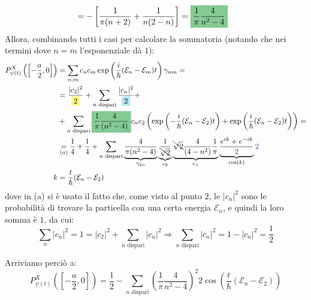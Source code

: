 \documentclass[../../FisicaTeorica.tex]{subfiles}
\begin{document}
\begin{enumerate}
\begin{align*}
&= -\left[\frac{1}{\pi(n+2)}+\frac{1}{n(2-n)}\right]=\hlc{ForestGreen}{\frac{1}{\pi} \frac{4}{n^2-4}}
\end{align*}
Allora, combinando tutti i casi per calcolare la sommatoria (notando che nei termini dove $n=m$ l'esponenziale dà $1$):
\begin{align*}
P^X_{\psi(t)}\left(\left[-\frac{a}{2},0\right]\right)&=
\sum_{n,m} c_n c_m \exp\left(\frac{i}{\hbar}(\mathcal{E}_n-\mathcal{E}_m)t\right)\gamma_{nm}
=\\
&=\frac{|c_2|^2}{\hlc{Yellow}{2}}+\sum_{n \text{ dispari}}\frac{|c_n|^2}{\hlc{SkyBlue}{2}}+\\
&+\sum_{n \text{ dispari}}\hlc{ForestGreen}{\frac{1}{\pi}\frac{4}{(n^2-4)}}c_n c_2\left(\exp\left(-\frac{i}{\hbar}(\mathcal{E}_n-\mathcal{E}_2)t \right)+ \exp\left(\frac{i}{\hbar}(\mathcal{E}_n-\mathcal{E}_2)t\right)\right) =\\
&\underset{(a)}{=}\frac{1}{4} + \frac{1}{4}+\sum_{n \text{ dispari}}\underbrace{\frac{4}{\pi(n^2-4)}}_{\gamma_{2n}}\underbrace{\frac{1}{\bcancel{\sqrt{2}}}}_{c_2}\underbrace{\bcancel{\sqrt{2}} \frac{4}{(4-n^2)}\frac{1}{\pi}}_{c_n} \underbrace{\frac{e^{ik}+e^{-ik}}{\textcolor{Blue}{2}}}_{\cos(k)}\textcolor{Blue}{2}\\
k&=\frac{t}{\hbar}(\mathcal{E}_n-\mathcal{E}_2)
\end{align*}
dove in (a) si è usato il fatto che, come visto al punto $2$, le $|c_n|^2$ sono le probabilità di trovare la particella con una certa energia $\mathcal{E}_n$, e quindi la loro somma è $1$, da cui:
\[
\sum_{n} |c_n|^2 = 1 = |c_2|^2 + \sum_{n \text{ dispari}}|c_n|^2 \Rightarrow  \sum_{n \text{ dispari}} |c_n|^2 = 1-|c_n|^2 = \frac{1}{2}
\]

Arriviamo perciò a:
\[
P_{\psi(t)}^X\left(\left[-\frac{a}{2},0\right]\right) = \frac{1}{2}-\sum_{n \text{ dispari}}\left(\frac{1}{\pi}\frac{4}{n^2-4}\right)^2 2\cos\left(\frac{t}{\hbar}(\mathcal{E}_n-\mathcal{E}_2)\right)
\]
\end{enumerate}
\end{document}
